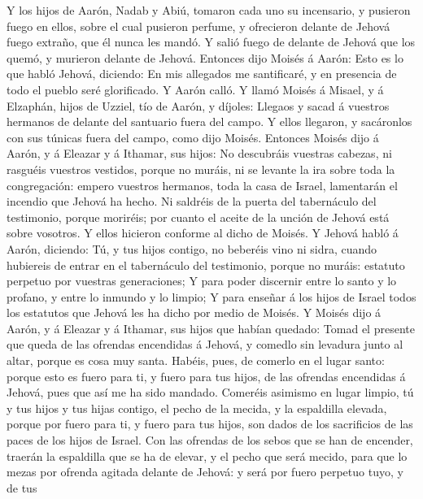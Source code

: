 Y los hijos de Aarón, Nadab y Abiú, tomaron cada uno su
incensario, y pusieron fuego en ellos, sobre el cual pusieron perfume, y
ofrecieron delante de Jehová fuego extraño, que él nunca les mandó.
 Y salió fuego de delante de Jehová que los quemó, y
murieron delante de Jehová.  Entonces dijo Moisés á Aarón:
Esto es lo que habló Jehová, diciendo: En mis allegados me santificaré,
y en presencia de todo el pueblo seré glorificado. Y Aarón calló.
 Y llamó Moisés á Misael, y á Elzaphán, hijos de Uzziel,
tío de Aarón, y díjoles: Llegaos y sacad á vuestros hermanos de delante
del santuario fuera del campo.  Y ellos llegaron, y
sacáronlos con sus túnicas fuera del campo, como dijo Moisés.
 Entonces Moisés dijo á Aarón, y á Eleazar y á Ithamar,
sus hijos: No descubráis vuestras cabezas, ni rasguéis vuestros
vestidos, porque no muráis, ni se levante la ira sobre toda la
congregación: empero vuestros hermanos, toda la casa de Israel,
lamentarán el incendio que Jehová ha hecho.  Ni saldréis
de la puerta del tabernáculo del testimonio, porque moriréis; por cuanto
el aceite de la unción de Jehová está sobre vosotros. Y ellos hicieron
conforme al dicho de Moisés.  Y Jehová habló á Aarón,
diciendo:  Tú, y tus hijos contigo, no beberéis vino ni
sidra, cuando hubiereis de entrar en el tabernáculo del testimonio,
porque no muráis: estatuto perpetuo por vuestras generaciones;
 Y para poder discernir entre lo santo y lo profano, y
entre lo inmundo y lo limpio;  Y para enseñar á los hijos
de Israel todos los estatutos que Jehová les ha dicho por medio de
Moisés.  Y Moisés dijo á Aarón, y á Eleazar y á Ithamar,
sus hijos que habían quedado: Tomad el presente que queda de las
ofrendas encendidas á Jehová, y comedlo sin levadura junto al altar,
porque es cosa muy santa.  Habéis, pues, de comerlo en el
lugar santo: porque esto es fuero para ti, y fuero para tus hijos, de
las ofrendas encendidas á Jehová, pues que así me ha sido mandado.
 Comeréis asimismo en lugar limpio, tú y tus hijos y tus
hijas contigo, el pecho de la mecida, y la espaldilla elevada, porque
por fuero para ti, y fuero para tus hijos, son dados de los sacrificios
de las paces de los hijos de Israel.  Con las ofrendas de
los sebos que se han de encender, traerán la espaldilla que se ha de
elevar, y el pecho que será mecido, para que lo mezas por ofrenda
agitada delante de Jehová: y será por fuero perpetuo tuyo, y de tus
